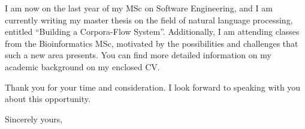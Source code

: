 \documentclass{letter} %
\begin{document}
\begin{letter}{}
\noindent I am now on the last year of my MSc on Software 
Engineering, and I am currently writing my master thesis on the
field of natural language processing, entitled ``Building a 
Corpora-Flow System''. Additionally, I am attending classes from
the Bioinformatics MSc, motivated by the possibilities and 
challenges that such a new area presents. You can find more
detailed information on my academic background on my enclosed CV.

\noindent Thank you for your time and consideration. I look 
forward to speaking with you about this opportunity.
 
\closing{Sincerely yours,} 
 

 

\end{letter}
 
\end{document}
